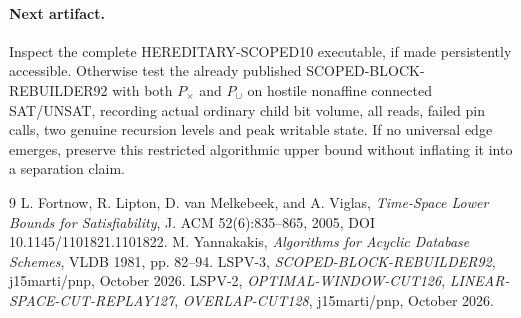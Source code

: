 \documentclass[11pt]{article}
\begin{document}
\paragraph{Next artifact.}
Inspect the complete HEREDITARY-SCOPED10 executable, if made persistently accessible. Otherwise test the already published SCOPED-BLOCK-REBUILDER92 with both $P_\times$ and $P_\cup$ on hostile nonaffine connected SAT/UNSAT, recording actual ordinary child bit volume, all reads, failed pin calls, two genuine recursion levels and peak writable state. If no universal edge emerges, preserve this restricted algorithmic upper bound without inflating it into a separation claim.

\begin{thebibliography}{9}
 L. Fortnow, R. Lipton, D. van Melkebeek, and A. Viglas, \emph{Time-Space Lower Bounds for Satisfiability}, J. ACM 52(6):835--865, 2005, DOI 10.1145/1101821.1101822.
 M. Yannakakis, \emph{Algorithms for Acyclic Database Schemes}, VLDB 1981, pp. 82--94.
 LSPV-3, \emph{SCOPED-BLOCK-REBUILDER92}, j15marti/pnp, October 2026.
 LSPV-2, \emph{OPTIMAL-WINDOW-CUT126}, \emph{LINEAR-SPACE-CUT-REPLAY127}, \emph{OVERLAP-CUT128}, j15marti/pnp, October 2026.
\end{thebibliography}
\end{document}
